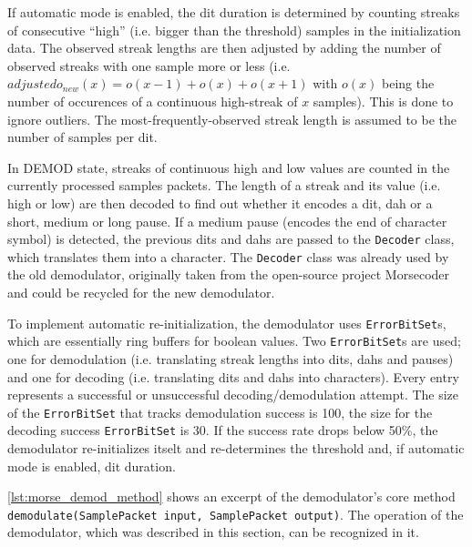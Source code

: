 If automatic mode is enabled, the dit duration is determined by counting streaks of consecutive ``high'' (i.e. bigger than the threshold) samples in the initialization data. The observed streak lengths are then adjusted by adding the number of observed streaks with one sample more or less (i.e. $adjusted o_{new}(x) = o(x-1) + o(x)+ o(x+1)$ with $o(x)$ being the number of occurences of a continuous high-streak of $x$ samples). This is done to ignore outliers. The most-frequently-observed streak length is assumed to be the number of samples per dit.

In DEMOD state, streaks of continuous high and low values are counted in the currently processed samples packets. The length of a streak and its value (i.e. high or low) are then decoded to find out whether it encodes a dit, dah or a short, medium or long pause. If a medium pause (encodes the end of character symbol) is detected, the previous dits and dahs are passed to the \texttt{Decoder} class, which translates them into a character. The \texttt{Decoder} class was already used by the old demodulator, originally taken from the open-source project Morsecoder and could be recycled for the new demodulator.

To implement automatic re-initialization, the demodulator uses \texttt{ErrorBitSet}s, which are essentially ring buffers for boolean values. Two \texttt{ErrorBitSet}s are used; one for demodulation (i.e. translating streak lengths into dits, dahs and pauses) and one for decoding (i.e. translating dits and dahs into characters). Every entry represents a successful or unsuccessful decoding/demodulation attempt. The size of the \texttt{ErrorBitSet} that tracks demodulation success is 100, the size for the decoding success \texttt{ErrorBitSet} is 30. If the success rate drops below 50\%, the demodulator re-initializes itselt and re-determines the threshold and, if automatic mode is enabled, dit duration.


\autoref{lst:morse_demod_method} shows an excerpt of the demodulator's core method \texttt{demodulate(SamplePacket input, SamplePacket output)}. The operation of the demodulator, which was described in this section, can be recognized in it.

